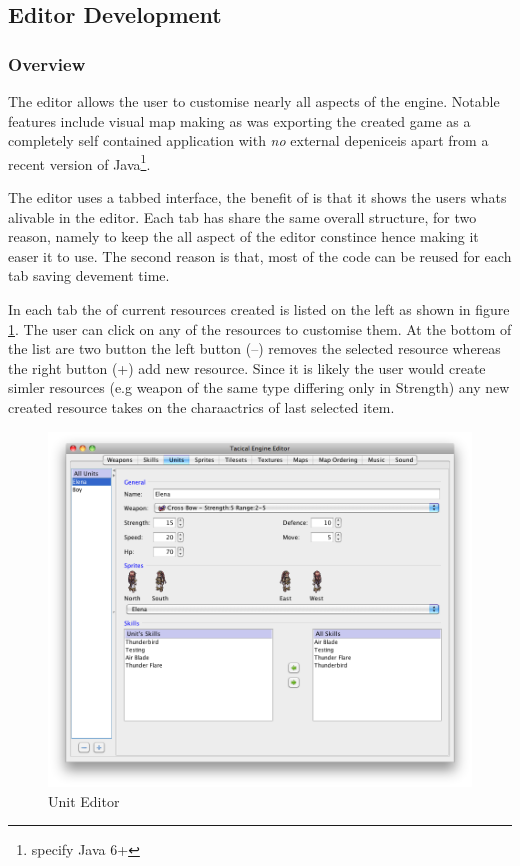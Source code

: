 \subsection{Editor Development}

\subsubsection{Overview}
\label{ssub:overview}

The editor allows the user to customise nearly all aspects of the engine.  Notable features include visual map making as was exporting the created game as a completely self contained application with \emph{no} external depeniceis apart from a recent version of Java\footnote{specify Java 6+}. 

The editor uses a tabbed interface, the benefit of is that it shows the users whats alivable in the editor. Each tab has share the same overall structure, for two reason, namely to keep the all aspect of the editor constince hence making it easer it to use. The second reason is that, most of the code can be reused for each tab saving devement time. 

In each tab the of current resources created is listed on the left as shown in figure \ref{fig:figures_editor_Units}. The user can click on any of the resources to customise them. At the bottom of the list are two button the left button (--) removes the selected resource whereas the right button (+) add new resource. Since it is likely the user would create simler resources (e.g  weapon of the same type differing only in Strength) any new created resource takes on the charaactrics of last selected item.

\begin{figure}[htbp]
	\centering
		\includegraphics[width=\textwidth]{figures/editor/Units.png}
	\caption{Unit Editor}
	\label{fig:figures_editor_Units}
\end{figure}


